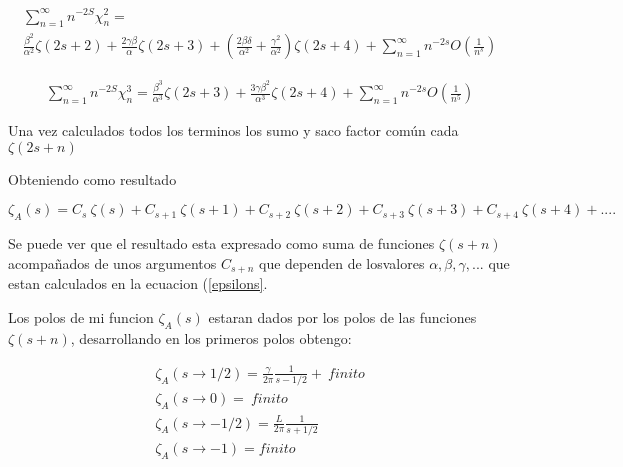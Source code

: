 \begin{equation}
\begin{array}{c}
    \sum _{n=1} ^{\infty}
    n   ^{-2 S} \chi _n ^2 = \\ 
    \frac{\beta ^2}{\alpha ^2} \zeta(2s+2) +
    \frac{2 \gamma \beta }{\alpha} \zeta (2s+3) + 
    \left( \frac{2 \beta \delta}{\alpha ^2} + \frac{\gamma ^2}{\alpha ^2} \right) \zeta (2s+4) + 
    \sum _{n=1} ^{\infty} n ^{-2s} O( \frac{1}{n^s} )
\end{array}
\end{equation}

\begin{equation}
\begin{array}{cc}
    \sum _{n=1} ^{\infty} 
    n ^{-2 S} \chi _n ^3 =
    \frac{\beta ^3}{\alpha ^3} \zeta (2s+3) + 
    \frac{3 \gamma \beta ^2}{\alpha ^3} \zeta (2s+4)
    + \sum _{n=1} ^{\infty} n ^{-2s} O( \frac{1}{n ^5} )
    
\end{array}
\end{equation}




Una vez calculados todos los terminos los sumo y saco factor común cada $\zeta( 2s+n )$


Obteniendo como resultado 

\begin{equation}
    \zeta _A (s) = 
    C _s \ \zeta (s) +
    C _{s+1} \ \zeta (s+1) + 
    C _{s+2} \ \zeta (s+2) +
    C _{s+3} \ \zeta (s+3) + 
    C _{s+4} \ \zeta (s+4) + ....
\end{equation}

Se puede ver que el resultado esta expresado como suma de funciones $\zeta (s+n)$ acompañados de unos argumentos $C_{s+n}$ que dependen de losvalores $\alpha,\beta,\gamma, ...$ que estan calculados en la ecuacion (\ref{epsilons}.

Los polos de mi funcion $\zeta _A (s)$ estaran dados por los polos de las funciones $\zeta (s+n)$, desarrollando en los primeros polos obtengo:

\begin{equation}
\begin{array}{c}
\zeta _A (s \rightarrow 1/2) = 
\frac{\gamma}{2 \pi } \frac{1}{s-1/2} + \ finito \\
\zeta _A (s \rightarrow 0) = \ finito \\
\zeta _A (s \rightarrow -1/2) = \frac{L}{2 \pi} \frac{1}{s+1/2} \\
\zeta _A (s \rightarrow -1) = finito \\
\end{array}
\end{equation}

